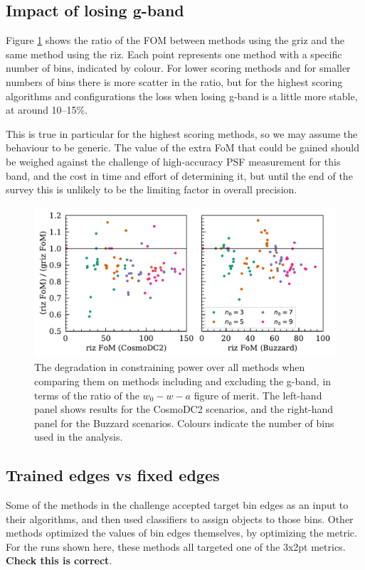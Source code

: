 \documentclass[twocolumn,twocolappendix]{aastex63}
\begin{document}
\subsection{Impact of losing g-band} \label{sec:gband}
Figure \ref{fig:loss} shows the ratio of the FOM between methods using the griz and the same method
using the riz.  Each point represents one method with a specific number of bins, indicated by colour.
For lower scoring methods and for smaller numbers of bins there is more scatter in the ratio,
but for the highest scoring algorithms and configurations the loss when losing g-band is a little
more stable, at around 10--15\%.

This is true in particular for the highest scoring methods, so we may assume the behaviour to be
generic. The value of the extra FoM that could be gained should be weighed against 
the challenge of high-accuracy
PSF measurement for this band, and the cost in time and effort of determining it, 
but until the end of the survey this is unlikely to be the limiting factor in overall precision.


\begin{figure}
\includegraphics[width=0.9\linewidth]{results/g_band_loss.pdf}
\caption{The degradation in constraining power over all methods
 when comparing them on methods including and excluding
the g-band, in terms of the ratio of the $w_0-w-a$ figure of merit.  The left-hand panel shows
results for the CosmoDC2 scenarios, and the right-hand panel for the Buzzard scenarios.  Colours
indicate the number of bins used in the analysis.}
\label{fig:loss}
\end{figure}

\subsection{Trained edges vs fixed edges}\label{sec:train-vs-fix}

Some of the methods in the challenge accepted target bin edges as an input to their algorithms,
and then used classifiers to assign objects to those bins.  Other methods optimized the values
of bin edges themselves, by optimizing the metric.  For the runs shown here, these methods all
targeted one of the 3x2pt metrics. \textbf{Check this is correct}.
\end{document}
